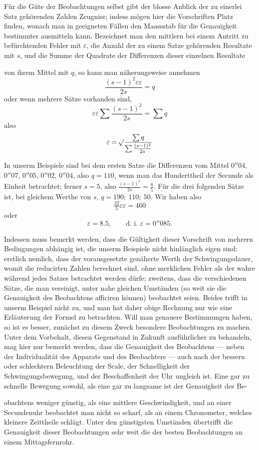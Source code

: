 Für die Güte der Beobachtungen selbst gibt der blosse Anblick der zu einerlei Satz gehörenden Zahlen Zeugniss; indess mögen hier die Vorschriften Platz finden, wonach man in geeigneten Fällen den Maassstab für die Genauigkeit bestimmter ausmitteln kann. Bezeichnet man den mittlern bei einem Antritt zu befürchtenden Fehler mit $\varepsilon$, die Anzahl der zu einem Satze gehörenden Resultate mit $s$, und die Summe der Quadrate der Differenzen dieser einzelnen Resultate
\par\GaussVSourceGathering{48\textsuperscript{*}}
\par\clearpage
{}
\noindent von ihrem Mittel mit $q$, so kann man näherungsweise annehmen
\[
\frac{(s-1)^2\varepsilon\varepsilon}{2s}=q
\]
oder wenn mehrere Sätze vorhanden sind,
\[
\varepsilon\varepsilon\sum\frac{(s-1)^2}{2s}=\sum q
\]
also
\[
\varepsilon=\mathord{{}^{}\!\surd}\frac{\sum q}{\sum\frac{(s-1)^2}{2s}}
\]

In unserm Beispiele sind bei dem ersten Satze die Differenzen vom Mittel $0''04$, $0''07$, $0''05$, $0''02$, $0''04$, also $q=110$, wenn man das Hunderttheil der Secunde als Einheit betrachtet; ferner $s=5$, also $\frac{(s-1)^2}{2s}=\frac85$. Für die drei folgenden Sätze ist, bei gleichem Werthe von $s$, $q=190;\ 110;\ 50$. Wir haben also
\[
\tfrac{32}{5}\varepsilon\varepsilon=460
\]
oder
\[
\varepsilon=8.5,\qquad\text{d. i. }\varepsilon=0''085.
\]

Indessen muss bemerkt werden, dass die Gültigkeit dieser Vorschrift von mehrern Bedingungen abhängig ist, die unserm Beispiele nicht hinlänglich eigen sind: erstlich nemlich, dass der vorausgesetzte genäherte Werth der Schwingungsdauer, womit die reducirten Zahlen berechnet sind, ohne merklichen Fehler als der wahre während jedes Satzes betrachtet werden dürfe; zweitens, dass die verschiedenen Sätze, die man vereinigt, unter nahe gleichen Umständen (so weit sie die Genauigkeit des Beobachtens afficiren können) beobachtet seien. Beides trifft in unserm Beispiel nicht zu, und man hat daher obige Rechnung nur wie eine Erläuterung der Formel zu betrachten. Will man genauere Bestimmungen haben, so ist es besser, zunächst zu diesem Zweck besondere Beobachtungen zu machen. Unter dem Vorbehalt, diesen Gegenstand in Zukunft ausführlicher zu behandeln, mag hier nur bemerkt werden, dass die Genauigkeit des Beobachtens — neben der Individualität des Apparats und des Beobachters — auch nach der bessern oder schlechtern Beleuchtung der Scale, der Schnelligkeit der Schwingungsbewegung, und der Beschaffenheit der Uhr ungleich ist. Eine gar zu schnelle Bewegung sowohl, als eine gar zu langsame ist der Genauigkeit des Be-
\par\clearpage
{}
\noindent obachtens weniger günstig, als eine mittlere Geschwindigkeit, und an einer Secundenuhr beobachtet man nicht so scharf, als an einem Chronometer, welches kleinere Zeittheile schlägt. Unter den günstigsten Umständen übertrifft die Genauigkeit dieser Beobachtungen sehr weit die der besten Beobachtungen an einem Mittagsfernrohr.

